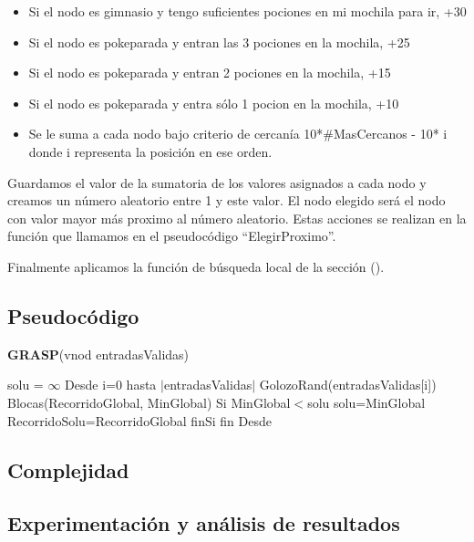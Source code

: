 \documentclass[spanish,12pt]{article}
\begin{document}
\begin{itemize}
	\item Si el nodo es gimnasio y tengo suficientes pociones en mi mochila para ir, +30
	\item Si el nodo es pokeparada y entran las 3 pociones en la mochila, +25
	\item Si el nodo es pokeparada y entran 2 pociones en la mochila, +15
	\item Si el nodo es pokeparada y entra sólo 1 pocion en la mochila, +10
	\item Se le suma a cada nodo  bajo criterio de cercanía 10*$\# $MasCercanos - 10* i donde i representa la posición en ese orden.
\end{itemize} 

Guardamos el valor de la sumatoria de los valores asignados a cada nodo  y creamos un número aleatorio entre 1 y este valor. El nodo elegido será el nodo con valor mayor más proximo al número aleatorio. Estas acciones se realizan en la función que llamamos en el pseudocódigo ``ElegirProximo''. 

Finalmente aplicamos la función de búsqueda local de la sección ().


\subsection{Pseudocódigo}

\begin{algorithm}[H]{\textbf{GRASP}(vnod entradasValidas)}
	\begin{algorithmic}[1]
		\State solu = $\infty$
		\State Desde i=0 hasta $|$entradasValidas$|$
		\State \quad GolozoRand(entradasValidas[i])
		\State \quad Blocas(RecorridoGlobal, MinGlobal)
		\State \quad Si MinGlobal$<$solu
		\State \qquad solu=MinGlobal
		\State \qquad RecorridoSolu=RecorridoGlobal
		\State \quad finSi
		\State fin Desde
		
	\end{algorithmic}
\end{algorithm}


\subsection{Complejidad}

\subsection{Experimentación y análisis de resultados}
\end{document}
